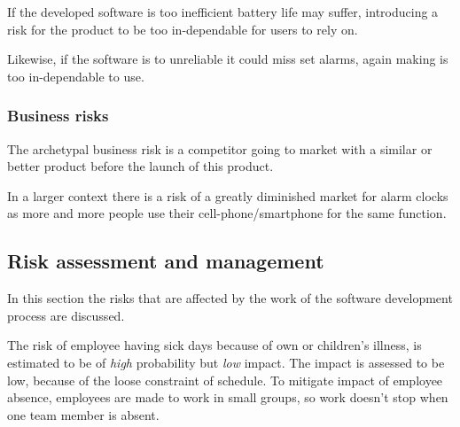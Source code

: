 \documentclass[Main]{subfiles}
\begin{document}
		If the developed software is too inefficient battery life may suffer, introducing a risk for the product to be too in-dependable for users to rely on.

		Likewise, if the software is to unreliable it could miss set alarms, again making is too in-dependable to use.



		\subsubsection{Business risks} %
		\label{sub:business_risks}

		The archetypal business risk is a competitor going to market with a similar or better product before the launch of this product.

		In a larger context there is a risk of a greatly diminished market for alarm clocks as more and more people use their cell-phone/smartphone for the same function.






	\subsection{Risk assessment and management} %
	\label{sub:risk_assessment_and_management}

	In this section the risks that are affected by the work of the software development process are discussed.

	The risk of employee having sick days because of own or children's illness, is estimated to be of \emph{high} probability but \emph{low} impact.
	The impact is assessed to be low, because of the loose constraint of schedule.
	To mitigate impact of employee absence, employees are made to work in small groups, so work doesn't stop when one team member is absent.
\end{document}
